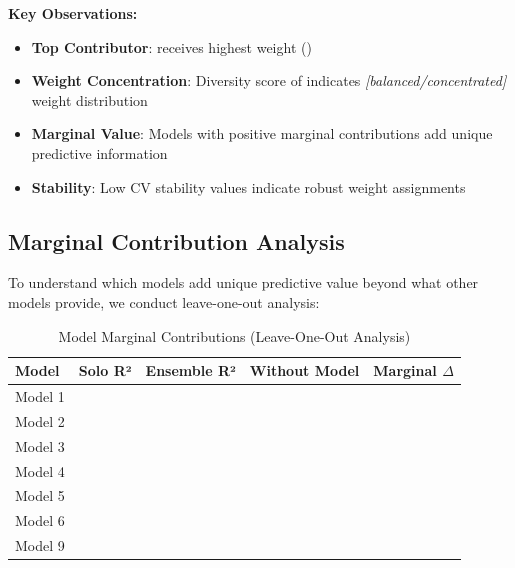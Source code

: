 \textbf{Key Observations:}
\begin{itemize}
    \item \textbf{Top Contributor}: \ModelElevenTopContributor{} receives highest weight (\ModelElevenTopWeight{})
    \item \textbf{Weight Concentration}: Diversity score of \ModelElevenDiversityScore{} indicates \textit{[balanced/concentrated]} weight distribution
    \item \textbf{Marginal Value}: Models with positive marginal contributions add unique predictive information
    \item \textbf{Stability}: Low CV stability values indicate robust weight assignments
\end{itemize}

\subsection{Marginal Contribution Analysis}

To understand which models add unique predictive value beyond what other models provide, we conduct leave-one-out analysis:

\begin{table}[ht]
\centering
\caption{Model Marginal Contributions (Leave-One-Out Analysis)}
\label{tab:model11_marginal}
\begin{tabular}{lcccc}
\toprule
\textbf{Model} & \textbf{Solo R²} & \textbf{Ensemble R²} & \textbf{Without Model} & \textbf{Marginal $\Delta$} \\
\midrule
Model 1 & \ModelElevenIndivRSquaredOne{} & \multirow{7}{*}{\ModelElevenRSquaredTest{}} & \ModelElevenWithoutRSquaredOne{} & \ModelElevenContribOne{} \\
Model 2 & \ModelElevenIndivRSquaredTwo{} & & \ModelElevenWithoutRSquaredTwo{} & \ModelElevenContribTwo{} \\
Model 3 & \ModelElevenIndivRSquaredThree{} & & \ModelElevenWithoutRSquaredThree{} & \ModelElevenContribThree{} \\
Model 4 & \ModelElevenIndivRSquaredFour{} & & \ModelElevenWithoutRSquaredFour{} & \ModelElevenContribFour{} \\
Model 5 & \ModelElevenIndivRSquaredFive{} & & \ModelElevenWithoutRSquaredFive{} & \ModelElevenContribFive{} \\
Model 6 & \ModelElevenIndivRSquaredSix{} & & \ModelElevenWithoutRSquaredSix{} & \ModelElevenContribSix{} \\
Model 9 & \ModelElevenIndivRSquaredNine{} & & \ModelElevenWithoutRSquaredNine{} & \ModelElevenContribNine{} \\
\bottomrule
\end{tabular}
\end{table}

